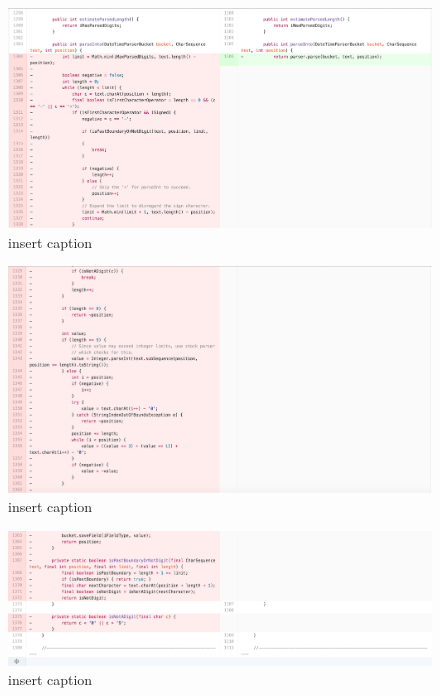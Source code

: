 \begin{figure}[H]
	\centering
	\includegraphics[width=\linewidth]{code6}
	\caption{insert caption}
\end{figure}
\begin{figure}[H]
	\centering
	\includegraphics[width=\linewidth]{code7}
	\caption{insert caption}
\end{figure}
\begin{figure}[H]
	\centering
	\includegraphics[width=\linewidth]{code8}
	\caption{insert caption}
\end{figure}
